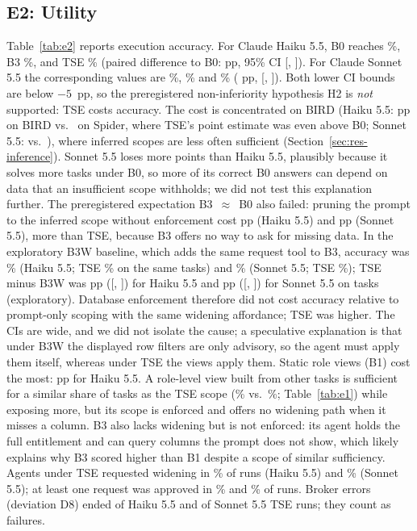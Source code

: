 \subsection{E2: Utility}
\label{sec:res-utility}
Table~\ref{tab:e2} reports execution accuracy. For Claude Haiku 5.5, B0 reaches \exHaikuBzero\%, B3 \exHaikuBthree\%,
and TSE \exHaikuTse\% (paired difference to B0: \dExHaikuTse{} pp, 95\% CI [\dExLoHaikuTse, \dExHiHaikuTse]). For
Claude Sonnet 5.5 the corresponding values are \exSonnetBzero\%, \exSonnetBthree\% and \exSonnetTse\% (\dExSonnetTse{}
pp, [\dExLoSonnetTse, \dExHiSonnetTse]). Both lower CI bounds are below $-5$~pp, so the preregistered non-inferiority
hypothesis H2 is \emph{not} supported: TSE costs accuracy. The cost is concentrated on BIRD (Haiku 5.5:
\dExHaikuTseBird{} pp on BIRD vs.\ \dExHaikuTseSpider{} on Spider, where TSE's point estimate was even above B0; Sonnet 5.5: \dExSonnetTseBird{} vs.\
\dExSonnetTseSpider), where inferred scopes are less often sufficient (Section~\ref{sec:res-inference}). Sonnet 5.5
loses more points than Haiku 5.5, plausibly because it solves more tasks under B0, so more of its correct B0 answers
can depend on data that an insufficient scope withholds; we did not test this explanation further. The
preregistered expectation B3~$\approx$~B0 also failed: pruning the prompt to the inferred scope without enforcement
cost \dExHaikuBthree{} pp (Haiku 5.5) and \dExSonnetBthree{} pp (Sonnet 5.5), more than TSE, because B3 offers no
way to ask for missing data. In the exploratory B3W baseline, which adds the same request tool to B3, accuracy was \bthreewExHaiku\% (Haiku 5.5;
TSE \bthreewTseExHaiku\% on the same tasks) and \bthreewExSonnet\% (Sonnet 5.5; TSE \bthreewTseExSonnet\%); TSE minus B3W
was \dTseBthreewHaiku{} pp ([\dLoTseBthreewHaiku, \dHiTseBthreewHaiku]) for Haiku 5.5 and \dTseBthreewSonnet{} pp
([\dLoTseBthreewSonnet, \dHiTseBthreewSonnet]) for Sonnet 5.5 on \ablN{} tasks (exploratory). Database
enforcement therefore did not cost accuracy relative to prompt-only scoping with the same widening affordance; TSE
was higher. The CIs are wide, and we did not isolate the cause; a speculative explanation is that under B3W the
displayed row filters are only advisory, so the agent must apply them itself, whereas under TSE the views apply them. Static role views (B1) cost the most:
\dExHaikuBone{} pp for Haiku 5.5. A role-level view built from other tasks is sufficient for a similar share of tasks
as the TSE scope (\suffBone\% vs.\ \suffTse\%; Table~\ref{tab:e1}) while exposing more, but its scope is enforced
and offers no widening path when it misses a column. B3 also lacks widening but is not enforced: its agent holds
the full entitlement and can query columns the prompt does not show, which likely explains why B3 scored higher
than B1 despite a scope of similar sufficiency. Agents under TSE requested widening in \wreqHaiku\% of runs (Haiku 5.5) and
\wreqSonnet\% (Sonnet 5.5); at least one request was approved in \wappHaiku\% and \wappSonnet\% of runs. Broker errors
(deviation D8) ended \brokerErrHaiku{} of \nTseRunsHaiku{} Haiku 5.5 and \brokerErrSonnet{} of \nTseRunsSonnet{}
Sonnet 5.5 TSE runs; they count as failures. 

